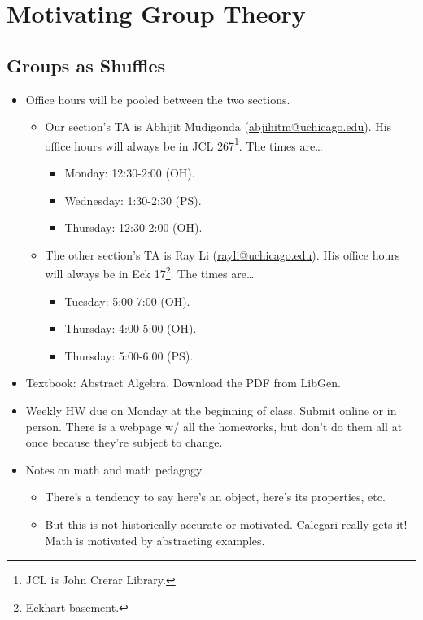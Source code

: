 \documentclass[../notes.tex]{subfiles}
\begin{document}
\chapter{Motivating Group Theory}
\section{Groups as Shuffles}
\begin{itemize}
    \item {}Office hours will be pooled between the two sections.
    \begin{itemize}
        \item Our section's TA is Abhijit Mudigonda (\href{mailto:abjihitm@uchicago.edu}{abjihitm@uchicago.edu}). His office hours will always be in JCL 267\footnote{JCL is John Crerar Library.}. The times are\dots
        \begin{itemize}
            \item Monday: 12:30-2:00 (OH).
            \item Wednesday: 1:30-2:30 (PS).
            \item Thursday: 12:30-2:00 (OH).
        \end{itemize}
        \item The other section's TA is Ray Li (\href{mailto:rayli@uchicago.edu}{rayli@uchicago.edu}). His office hours will always be in Eck 17\footnote{Eckhart basement.}. The times are\dots
        \begin{itemize}
            \item Tuesday: 5:00-7:00 (OH).
            \item Thursday: 4:00-5:00 (OH).
            \item Thursday: 5:00-6:00 (PS).
        \end{itemize}
    \end{itemize}
    \item Textbook: Abstract Algebra. Download the PDF from LibGen.
    \item Weekly HW due on Monday at the beginning of class. Submit online or in person. There is a webpage w/ all the homeworks, but don't do them all at once because they're subject to change.
    \item Notes on math and math pedagogy.
    \begin{itemize}
        \item There's a tendency to say here's an object, here's its properties, etc.
        \item But this is not historically accurate or motivated. Calegari really gets it! Math is motivated by abstracting examples.

\end{itemize}
\end{itemize}
\end{document}
